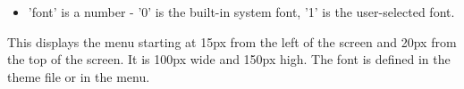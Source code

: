   \begin{itemize}
    \item 'font' is a number - '0' is the built-in system font, '1' is the
    user-selected font.
  \end{itemize}

\begin{example}
\end{example}
This displays the menu starting at 15px from the left of the screen and 20px
from the top of the screen.  It is 100px wide and 150px high. The font is
defined in the theme  file or in the  menu.
